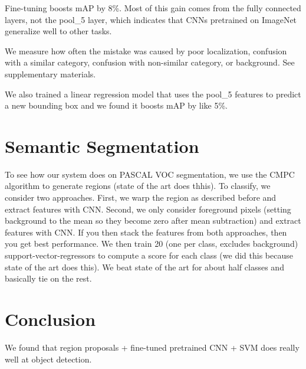 \documentclass[a4paper]{article}
\begin{document}
Fine-tuning boosts mAP by 8\%. Most of this gain comes from the fully connected
layers, not the pool_5 layer, which indicates that CNNs pretrained on ImageNet
generalize well to other tasks.

We measure how often the mistake was caused by poor localization,
confusion with a similar category, confusion with non-similar category, or
background. See supplementary materials.

We also trained a linear regression model that uses the pool_5 features to
predict a new bounding box and we found it boosts mAP by like 5\%.

\section{Semantic Segmentation}
To see how our system does on PASCAL VOC segmentation, we use the CMPC
algorithm to generate regions (state of the art does thhis). To classify,
we consider two approaches. First,
we warp the region as described before and extract features with CNN.
Second, we only consider foreground pixels (setting background to the mean so
they become zero after mean subtraction) and extract features with CNN. If you
then stack the features from both approaches, then you get best performance.
We then train 20 (one per class, excludes background) support-vector-regressors
to compute a score for each class (we did this because state of the art does
this). We beat state of the art for about half classes and basically tie on
the rest.

\section{Conclusion}
We found that region proposals + fine-tuned pretrained CNN + SVM does really
well at object detection.
\end{document}
